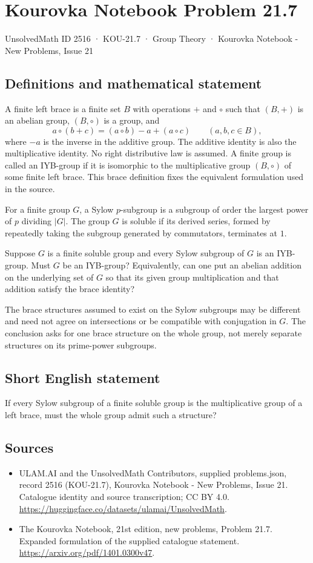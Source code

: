 \documentclass[11pt,a4paper]{article}
\begin{document}
\section*{Kourovka Notebook Problem 21.7}\label{2516}
{\small UnsolvedMath ID 2516 · KOU-21.7 · Group Theory · Kourovka Notebook - New Problems, Issue 21}
\subsection{Definitions and mathematical statement}
A finite left brace is a finite set $B$ with operations $+$ and $\circ$
such that $(B,+)$ is an abelian group, $(B,\circ)$ is a group, and
\[
 a\circ(b+c)=(a\circ b)-a+(a\circ c)
                       \qquad(a,b,c\in B),
\]
where $-a$ is the inverse in the additive group. The additive identity
is also the multiplicative identity. No right distributive law is
assumed. A finite group is called an IYB-group if it is isomorphic to
the multiplicative group $(B,\circ)$ of some finite left brace.
This brace definition fixes the equivalent formulation used in the source.

For a finite group $G$, a Sylow $p$-subgroup is a subgroup of order the
largest power of $p$ dividing $|G|$. The group $G$ is soluble if its
derived series, formed by repeatedly taking the subgroup generated by
commutators, terminates at $1$.

Suppose $G$ is a finite soluble group and every Sylow subgroup of $G$
is an IYB-group. Must $G$ be an IYB-group? Equivalently, can one put an
abelian addition on the underlying set of $G$ so that its given group
multiplication and that addition satisfy the brace identity?

The brace structures assumed to exist on the Sylow subgroups may be
different and need not agree on intersections or be compatible with
conjugation in $G$. The conclusion asks for one brace structure on the
whole group, not merely separate structures on its prime-power subgroups.
\subsection{Short English statement}
If every Sylow subgroup of a finite soluble group is the multiplicative group of a left brace, must the whole group admit such a structure?
\subsection{Sources}
\begin{itemize}
\item[S1] ULAM.AI and the UnsolvedMath Contributors, supplied problems.json, record 2516 (KOU-21.7), Kourovka Notebook - New Problems, Issue 21. Catalogue identity and source transcription; CC BY 4.0.
\url{https://huggingface.co/datasets/ulamai/UnsolvedMath}.
\item[S2] The Kourovka Notebook, 21st edition, new problems, Problem 21.7. Expanded formulation of the supplied catalogue statement.
\url{https://arxiv.org/pdf/1401.0300v47}.
\end{itemize}
\end{document}
